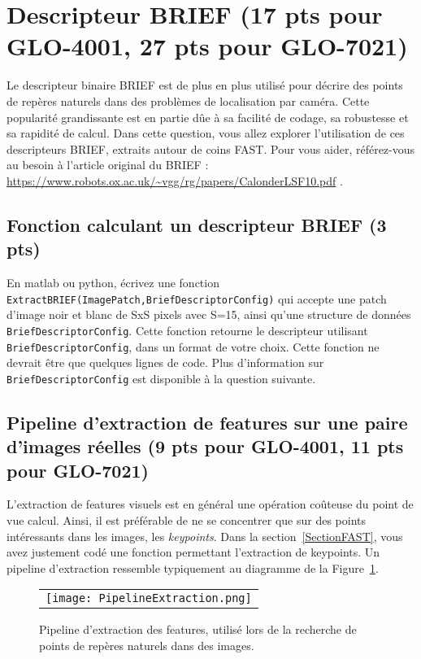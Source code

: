 \documentclass[12pt]{article}
\begin{document}

\newpage
\section{Descripteur BRIEF (17 pts pour GLO-4001, 27 pts pour GLO-7021)}
Le descripteur binaire BRIEF est de plus en plus utilisé pour décrire des points de repères naturels dans des problèmes de localisation par caméra. Cette popularité grandissante est en partie dûe à sa facilité de codage, sa robustesse et sa rapidité de calcul. Dans cette question, vous allez explorer l'utilisation de ces descripteurs BRIEF, extraits autour de coins FAST. Pour vous aider, référez-vous au besoin à l'article original du BRIEF : \url{https://www.robots.ox.ac.uk/~vgg/rg/papers/CalonderLSF10.pdf} .

\subsection{Fonction calculant un descripteur BRIEF (3 pts)}
En matlab ou python, écrivez une fonction \texttt{ExtractBRIEF(ImagePatch,BriefDescriptorConfig)} qui accepte une patch d'image noir et blanc de SxS pixels avec S=15, ainsi qu'une structure de données \texttt{BriefDescriptorConfig}. Cette fonction retourne le descripteur utilisant \texttt{BriefDescriptorConfig}, dans un format de votre choix. Cette fonction ne devrait être que quelques lignes de code. Plus d'information sur \texttt{BriefDescriptorConfig} est disponible à la question suivante.

\subsection{Pipeline d'extraction de features sur une paire d'images réelles (9 pts pour GLO-4001, 11 pts pour GLO-7021)}
L'extraction de features visuels est en général une opération coûteuse du point de vue calcul. Ainsi, il est préférable de ne se concentrer que sur des points intéressants dans les images, les \emph{keypoints}. Dans la section~\ref{SectionFAST}, vous avez justement codé une fonction permettant l'extraction de keypoints. Un pipeline d'extraction ressemble typiquement au diagramme de la Figure~\ref{PipelineExtraction}.

\begin{figure}[ht]
 \begin{center}
  \begin{tabular}{c}
    \texttt{[image: PipelineExtraction.png]}
  \end{tabular}
 \end{center}
\vspace{-0.25in}
 \caption{Pipeline d'extraction des features, utilisé lors de la recherche de points de repères naturels dans des images.}
 \label{PipelineExtraction}
\end{figure}
\end{document}
